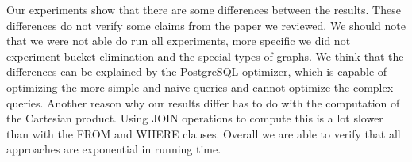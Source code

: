 Our experiments show that there are some differences between the results. These differences do not verify some claims from the paper \cite{paper} we reviewed. We should note that we were not able do run all experiments, more specific we did not experiment bucket elimination and the special types of graphs. We think that the differences can be explained by the PostgreSQL optimizer, which is capable of optimizing the more simple and naive queries and cannot optimize the complex queries. Another reason why our results differ has to do with the computation of the Cartesian product. Using JOIN operations to compute this is a lot slower than with the FROM and WHERE clauses. Overall we are able to verify that all approaches are exponential in running time. 